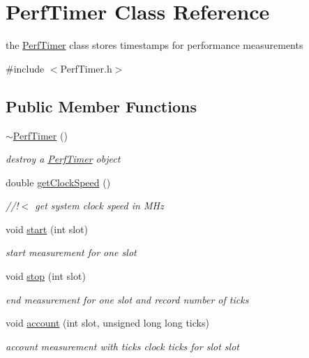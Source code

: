 \hypertarget{classPerfTimer}{}\section{Perf\+Timer Class Reference}
\label{classPerfTimer}


the \hyperlink{classPerfTimer}{Perf\+Timer} class stores timestamps for performance measurements  




{\ttfamily \#include $<$Perf\+Timer.\+h$>$}

\subsection*{Public Member Functions}
\begin{DoxyCompactItemize}
\item 
\mbox{\label{classPerfTimer_ab35a935e243bc23052a9ff1762537a41}} 
\hyperlink{classPerfTimer_ab35a935e243bc23052a9ff1762537a41}{$\sim$\+Perf\+Timer} ()
\begin{DoxyCompactList}\small\item\em destroy a \hyperlink{classPerfTimer}{Perf\+Timer} object \end{DoxyCompactList}\item 
double \hyperlink{classPerfTimer_ada7ba72a813fdb2b0dad40894e06660f}{get\+Clock\+Speed} ()
\begin{DoxyCompactList}\small\item\em //!$<$ get system clock speed in M\+Hz \end{DoxyCompactList}\item 
void \hyperlink{classPerfTimer_a5ffdaeb63f13089d49c6be96c8d82304}{start} (int slot)
\begin{DoxyCompactList}\small\item\em start measurement for one slot \end{DoxyCompactList}\item 
void \hyperlink{classPerfTimer_afaad955880deb107074bf3f477528aa9}{stop} (int slot)
\begin{DoxyCompactList}\small\item\em end measurement for one slot and record number of ticks \end{DoxyCompactList}\item 
void \hyperlink{classPerfTimer_afda4ca8efb7e0546908a47857d5e3f87}{account} (int slot, unsigned long long ticks)
\begin{DoxyCompactList}\small\item\em account measurement with \textquotesingle{}ticks\textquotesingle{} clock ticks for slot \textquotesingle{}slot\textquotesingle{} \end{DoxyCompactList}\item 

\end{DoxyCompactItemize}
